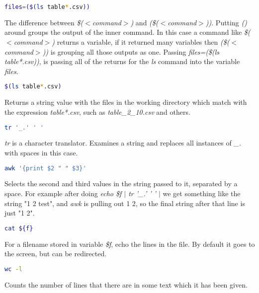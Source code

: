 \documentclass{article}
\begin{document}
\begin{lstlisting}[language=bash]
	files=($(ls table*.csv))
\end{lstlisting}

	The difference between \textit{\$($<$command$>$)} and \textit{(\$($<$command$>$))}. Putting \textit{()} around groups the output of the inner command.
	In this case a command like  \textit{\$($<$command$>$)} returns a variable, if it returned many variables then \textit{(\$($<$command$>$))} is grouping all those outputs as one.
	Passing \textit{files=(\$(ls table*.csv))}, is passing all of the returns for the \textit{ls} command into the variable \textit{files}.
	
\begin{lstlisting}[language=bash]
	$(ls table*.csv)
\end{lstlisting}	
	Returns a string value with the files in the working directory which match with the expression \textit{table*.csv}, such as \textit{table\_2\_10.csv} and others.
	

\begin{lstlisting}[language=bash]
	tr '_.' ' '
\end{lstlisting}
	
	\textit{tr} is a character translator. Examines a string and replaces all instances of \textit{\_.} with spaces in this case. 
	
\begin{lstlisting}[language=bash]
	awk '{print $2 " " $3}'
\end{lstlisting}

	Selects the second and third values in the string passed to it, separated by a space. For example after doing \textit{echo \${f} $|$ tr '\_.' ' ' $|$} we get something like
	the string "1 2 test", and \textit{awk} is pulling out 1 2, so the final string after that line is just "1 2".
	
	
\begin{lstlisting}[language=bash]
	cat ${f}
\end{lstlisting}
    For a filename stored in variable \textit{\$f}, echo the lines in the file. By default it goes to the screen, but can be redirected.
    
    
\begin{lstlisting}[language=bash]
	wc -l
\end{lstlisting}
    Counts the number of lines that there are in some text which it has been given. 
    
\end{document}
